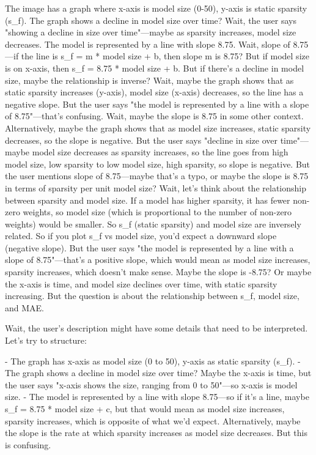 The image has a graph where x-axis is model size (0-50), y-axis is static sparsity (s_f). The graph shows a decline in model size over time? Wait, the user says "showing a decline in size over time"—maybe as sparsity increases, model size decreases. The model is represented by a line with slope 8.75. Wait, slope of 8.75—if the line is s_f = m * model size + b, then slope m is 8.75? But if model size is on x-axis, then s_f = 8.75 * model size + b. But if there's a decline in model size, maybe the relationship is inverse? Wait, maybe the graph shows that as static sparsity increases (y-axis), model size (x-axis) decreases, so the line has a negative slope. But the user says "the model is represented by a line with a slope of 8.75"—that's confusing. Wait, maybe the slope is 8.75 in some other context. Alternatively, maybe the graph shows that as model size increases, static sparsity decreases, so the slope is negative. But the user says "decline in size over time"—maybe model size decreases as sparsity increases, so the line goes from high model size, low sparsity to low model size, high sparsity, so slope is negative. But the user mentions slope of 8.75—maybe that's a typo, or maybe the slope is 8.75 in terms of sparsity per unit model size? Wait, let's think about the relationship between sparsity and model size. If a model has higher sparsity, it has fewer non-zero weights, so model size (which is proportional to the number of non-zero weights) would be smaller. So s_f (static sparsity) and model size are inversely related. So if you plot s_f vs model size, you'd expect a downward slope (negative slope). But the user says "the model is represented by a line with a slope of 8.75"—that's a positive slope, which would mean as model size increases, sparsity increases, which doesn't make sense. Maybe the slope is -8.75? Or maybe the x-axis is time, and model size declines over time, with static sparsity increasing. But the question is about the relationship between s_f, model size, and MAE. 

Wait, the user's description might have some details that need to be interpreted. Let's try to structure:

- The graph has x-axis as model size (0 to 50), y-axis as static sparsity (s_f). 
- The graph shows a decline in model size over time? Maybe the x-axis is time, but the user says "x-axis shows the size, ranging from 0 to 50"—so x-axis is model size. 
- The model is represented by a line with slope 8.75—so if it's a line, maybe s_f = 8.75 * model size + c, but that would mean as model size increases, sparsity increases, which is opposite of what we'd expect. Alternatively, maybe the slope is the rate at which sparsity increases as model size decreases. But this is confusing. 


